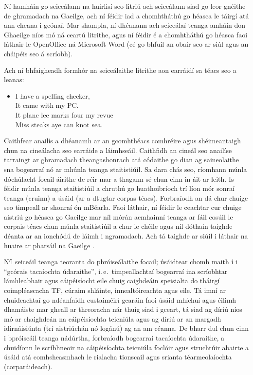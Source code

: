 \begin{multicols}{2}
Ní hamháin go seiceálann na huirlisí seo litriú ach seiceálann siad go leor gnéithe de ghramadach na Gaeilge, ach ní féidir iad a chomhtháthú go héasca le táirgí atá ann cheana i gcónaí. Mar shampla, ní dhéanann ach seiceálaí teanga amháin don Ghaeilge \cite{gramadoir} níos mó ná ceartú litrithe, agus ní féidir é a chomhtháthú go héasca faoi láthair le OpenOffice ná Microsoft Word (cé go bhfuil an obair seo ar siúl agus an cháipéis seo á scríobh).  

Ach ní bhfaigheadh formhór na seiceálaithe litrithe aon earráidí sa téacs seo \cite{zar1} a leanas: 

\begin{itemize}
\item[] I have a spelling checker,\\
  It came with my PC.\\
  It plane lee marks four my revue\\
  Miss steaks aye can knot sea.
\end{itemize}

Caithfear anailís a dhéanamh ar an gcomhthéacs comhréire agus shéimeantaigh chun na cineálacha seo earráide a láimhseáil. Caithfidh an cineál seo anailíse tarraingt ar ghramadach theangashonrach atá códaithe go dian ag saineolaithe sna bogearraí nó ar mhúnla teanga staitistiúil. Sa dara chás seo, ríomhann múnla dóchúlacht focail áirithe de réir mar a thagann sé chun cinn in áit ar leith. Is féidir múnla teanga staitistiúil a chruthú go huathoibríoch trí líon mór sonraí teanga (cruinn) a úsáid (ar a dtugtar corpas téacs). Forbraíodh an dá chur chuige seo timpeall ar shonraí ón mBéarla. Faoi láthair, ní féidir le ceachtar cur chuige aistriú go héasca go Gaeilge mar níl mórán acmhainní teanga ar fáil cosúil le corpais téacs chun múnla staitistiúil a chur le chéile agus níl dóthain taighde déanta ar an ionchódú de láimh i ngramadach. Ach tá taighde ar siúil i láthair na huaire ar pharsáil na Gaeilge \cite{lynn2012,elaine2010}.

Níl seiceáil teanga teoranta do phróiseálaithe focail; úsáidtear chomh maith í i ``gcórais tacaíochta údaraithe'', i.\,e.~timpeallachtaí bogearraí ina scríobhtar lámhleabhair agus cáipéisíocht eile chuig caighdeáin speisialta do tháirgí coimpléascacha TF, cúraim shláinte, innealtóireachta agus eile. Tá imní ar chuideachtaí go ndéanfaidh custaiméirí gearáin faoi úsáid mhíchuí agus éilimh dhamáiste mar gheall ar threoracha nár thuig siad i gceart, tá siad ag díriú níos mó ar chaighdeán na cáipéisíochta teicniúla agus ag díriú ar an margadh idirnáisiúnta (trí aistriúchán nó logánú) ag an am céanna. De bharr dul chun cinn i bpróiseáil teanga nádúrtha, forbraíodh bogearraí tacaíochta údaraithe, a chuidíonn le scríbhneoir na cáipéisíochta teicniúla foclóir agus struchtúir abairte a úsáid atá comhsheasmhach le rialacha tionscail agus srianta téarmeolaíochta (corparáideach).


\end{multicols}
